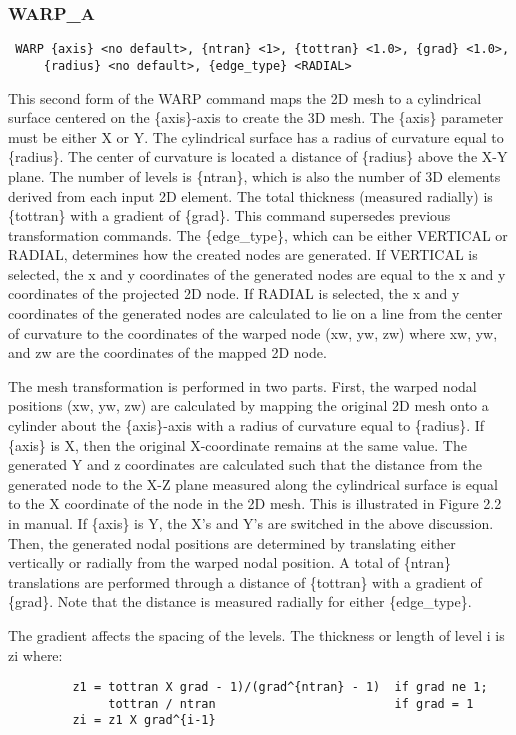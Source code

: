 \subsubsection{WARP\_A}
\begin{verbatim}
 WARP {axis} <no default>, {ntran} <1>, {tottran} <1.0>, {grad} <1.0>,
     {radius} <no default>, {edge_type} <RADIAL>
\end{verbatim}

This second form of the WARP command maps the 2D mesh to a cylindrical
surface centered on the \{axis\}-axis to create the 3D mesh.  The \{axis\}
parameter must be either X or Y.  The cylindrical surface has a radius
of curvature equal to \{radius\}.  The center of curvature is located a
distance of \{radius\} above the X-Y plane.  The number of levels is
\{ntran\}, which is also the number of 3D elements derived from each input
2D element.  The total thickness (measured radially) is \{tottran\} with a
gradient of \{grad\}.  This command supersedes previous transformation
commands.
The \{edge\_type\}, which can be either VERTICAL or RADIAL, determines how
the created nodes are generated.  If VERTICAL is selected, the x and y
coordinates of the generated nodes are equal to the x and y coordinates
of the projected 2D node.  If RADIAL is selected, the x and y
coordinates of the generated nodes are calculated to lie on a line from
the center of curvature to the coordinates of the warped node (xw, yw,
zw) where xw, yw, and zw are the coordinates of the mapped 2D node.

The mesh transformation is performed in two parts.  First, the warped
nodal positions (xw, yw, zw) are calculated by mapping the original 2D
mesh onto a cylinder about the \{axis\}-axis with a radius of curvature
equal to \{radius\}.  If \{axis\} is X, then the original X-coordinate
remains at the same value.  The generated Y and z coordinates are
calculated such that the distance from the generated node to the X-Z
plane measured along the cylindrical surface is equal to the X
coordinate of the node in the 2D mesh.  This is illustrated in Figure
2.2 in manual.  If \{axis\} is Y, the X's and Y's are switched in the
above discussion.  Then, the generated nodal positions are determined by
translating either vertically or radially from the warped nodal
position.  A total of \{ntran\} translations are performed through a
distance of \{tottran\} with a gradient of \{grad\}.  Note that the distance
is measured radially for either \{edge\_type\}.

The gradient affects the spacing of the levels.  The thickness or length
of level i is zi where:
\begin{verbatim}
         z1 = tottran X grad - 1)/(grad^{ntran} - 1)  if grad ne 1;
              tottran / ntran                         if grad = 1
         zi = z1 X grad^{i-1}
\end{verbatim}

